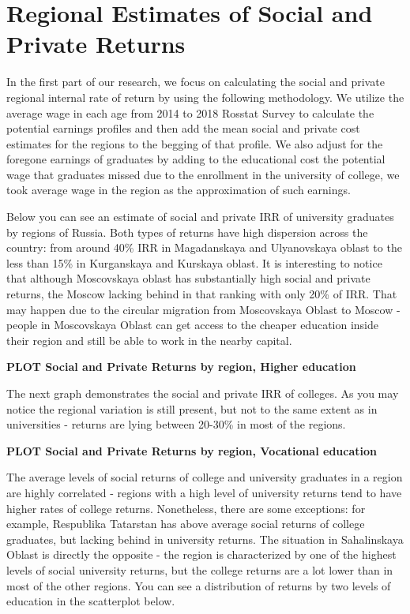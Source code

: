 \documentclass[alpha-refs]{wiley-article-05g}
\begin{document}
\newpage

\section{Regional Estimates of Social and Private Returns}


In the first part of our research, we focus on calculating the social and private regional internal rate of return by using the following methodology. We utilize the average wage in each age from 2014 to 2018 Rosstat Survey to calculate the potential earnings profiles and then add the mean social and private cost estimates for the regions to the begging of that profile. We also adjust for the foregone earnings of graduates by adding to the educational cost the potential wage that graduates missed due to the enrollment in the university of college, we took average wage in the region as the approximation of such earnings.

Below you can see an estimate of social and private IRR of university graduates by regions of Russia. Both types of returns have high dispersion across the country: from around 40\% IRR in Magadanskaya and Ulyanovskaya oblast to the less than 15\% in Kurganskaya and Kurskaya oblast. It is interesting to notice that although Moscovskaya oblast has substantially high social and private returns, the Moscow lacking behind in that ranking with only 20\% of IRR. That may happen due to the circular migration from Moscovskaya Oblast to Moscow - people in Moscovskaya Oblast can get access to the cheaper education inside their region and still be able to work in the nearby capital.

\textbf{PLOT Social and Private Returns by region, Higher education}

The next graph demonstrates the social and private IRR of colleges. As you may notice the regional variation is still present, but not to the same extent as in universities - returns are lying between 20-30\% in most of the regions.

\textbf{PLOT Social and Private Returns by region, Vocational education}

The average levels of social returns of college and university graduates in a region are highly correlated - regions with a high level of university returns tend to have higher rates of college returns. Nonetheless, there are some exceptions: for example, Respublika Tatarstan has above average social returns of college graduates, but lacking behind in university returns. The situation in Sahalinskaya Oblast is directly the opposite - the region is characterized by one of the highest levels of social university returns, but the college returns are a lot lower than in most of the other regions. You can see a distribution of returns by two levels of education in the scatterplot below.
\end{document}
